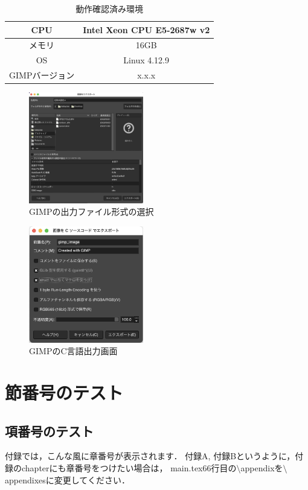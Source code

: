 \begin{table}[H]
  \begin{center}
    \caption{動作確認済み環境}
    \label{tb:conform_env}
    \begin{tabular}{c|c}
      \hline \hline
      CPU              & Intel Xeon CPU E5-2687w v2 \\ \hline
      メモリ           & 16GB                       \\ \hline
      OS               & Linux 4.12.9               \\ \hline
      GIMPバージョン & x.x.x \\ \hline
    \end{tabular}
  \end{center}
\end{table}


\begin{figure}[H]
  \begin{center}
    \includegraphics[width=5cm,clip]{figure/gimp1.png}
    \caption{GIMPの出力ファイル形式の選択}
    \label{fig:gimp1}
  \end{center}
\end{figure}


\begin{figure}[H]
  \begin{center}
    \includegraphics[width=5cm,clip]{figure/gimp2.png}
    \caption{GIMPのC言語出力画面}
    \label{fig:gimp1}
  \end{center}
\end{figure}


\section{節番号のテスト}
\subsection{項番号のテスト}
付録では，こんな風に章番号が表示されます．
付録A, 付録Bというように，付録のchapterにも章番号をつけたい場合は，
main.tex66行目の$\setminus$appendixを$\setminus$appendixesに変更してください．


